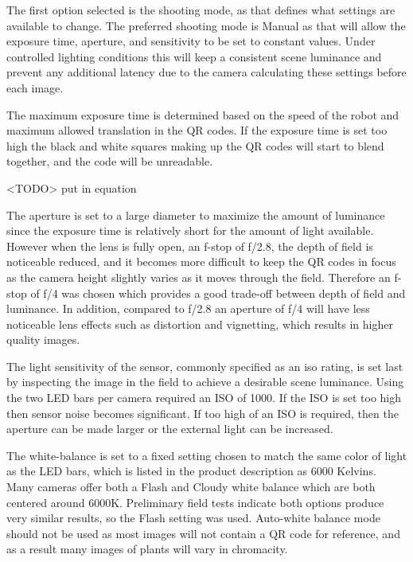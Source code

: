 The first option selected is the shooting mode, as that defines what settings are available to change.  The preferred shooting mode is Manual as that will allow the exposure time, aperture, and sensitivity to be set to constant values.  Under controlled lighting conditions this will keep a consistent scene luminance and prevent any additional latency due to the camera calculating these settings before each image.

The maximum exposure time is determined based on the speed of the robot and maximum allowed translation in the QR codes.  If the exposure time is set too high the black and white squares making up the QR codes will start to blend together, and the code will be unreadable.  

<TODO> put in equation 

The aperture is set to a large diameter to maximize the amount of luminance since the exposure time is relatively short for the amount of light available.  However when the lens is fully open, an f-stop of f/2.8, the depth of field is noticeable reduced, and it becomes more difficult to keep the QR codes in focus as the camera height slightly varies as it moves through the field.  Therefore an f-stop of f/4 was chosen which provides a good trade-off between depth of field and luminance.  In addition, compared to f/2.8 an aperture of f/4 will have less noticeable lens effects such as distortion and vignetting, which results in higher quality images.  

The light sensitivity of the sensor, commonly specified as an \ac{iso} rating, is set last by inspecting the image in the field to achieve a desirable scene luminance.  Using the two LED bars per camera required an ISO of 1000.  If the ISO is set too high then sensor noise becomes significant.  If too high of an ISO is required, then the aperture can be made larger or the external light can be increased.  

The white-balance is set to a fixed setting chosen to match the same color of light as the LED bars, which is listed in the product description as 6000 Kelvins.  Many cameras offer both a Flash and Cloudy white balance which are both centered around 6000K.   Preliminary field tests indicate both options produce very similar results, so the Flash setting was used.  Auto-white balance mode should not be used as most images will not contain a QR code for reference, and as a result many images of plants will vary in chromacity. 

